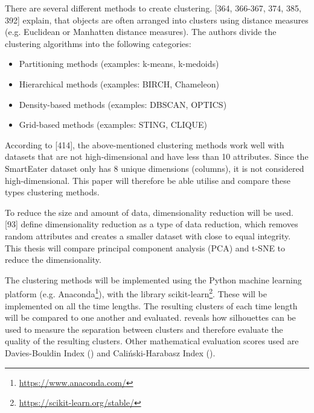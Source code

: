 There are several different methods to create clustering. \textcite{han2011data}[364, 366-367, 374, 385, 392] explain, that objects are often arranged into clusters using distance measures (e.g. Euclidean or Manhatten distance measures). 
The authors divide the clustering algorithms into the following categories:
\begin{itemize}
	\item Partitioning methods (examples: k-means, k-medoids)
	\item Hierarchical methods (examples: BIRCH, Chameleon)
	\item Density-based methods (examples: DBSCAN, OPTICS)
	\item Grid-based methods (examples: STING, CLIQUE)
\end{itemize}


According to \textcite{han2011data}[414], the above-mentioned clustering methods work well with datasets that are not high-dimensional and have less than 10 attributes. Since the SmartEater dataset only has 8 unique dimensions (columns), it is not considered high-dimensional. This paper will therefore be able utilise and compare these types clustering methods. 

To reduce the size and amount of data, dimensionality reduction will be used. \textcite{han2011data}[93] define dimensionality reduction as a type of data reduction, which removes random attributes and creates a smaller dataset with close to equal integrity. This thesis will compare principal component analysis (PCA) and t-SNE to reduce the dimensionality.

The clustering methods will be implemented using the Python machine learning platform (e.g. Anaconda\footnote{\url{https://www.anaconda.com/}}), with the library scikit-learn\footnote{\url{https://scikit-learn.org/stable/}}. These will be implemented on all the time lengths. The resulting clusters of each time length will be compared to one another and evaluated. 
\textcite{rousseeuw1987silhouettes} reveals how silhouettes can be used to measure the separation between clusters and therefore evaluate the quality of the resulting clusters. Other mathematical evaluation scores used are Davies-Bouldin Index (\textcite{DaviesBouldin}) and Caliński-Harabasz Index (\textcite{calinskiHarabasz}).

